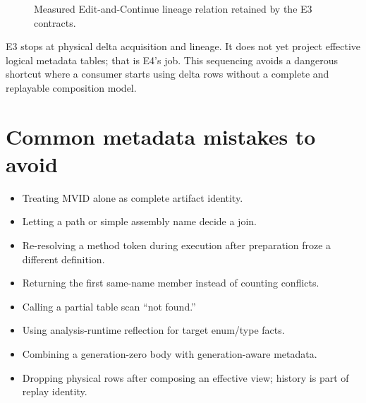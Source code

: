 \documentclass[11pt,oneside,openany]{book}
\begin{document}
\begin{figure}[htbp]
\centering
{}
\caption{Measured Edit-and-Continue lineage relation retained by the E3 contracts.}
\label{fig:enc-lineage}
\end{figure}

E3 stops at physical delta acquisition and lineage. It does not yet project effective logical metadata tables; that is E4's job. This sequencing avoids a dangerous shortcut where a consumer starts using delta rows without a complete and replayable composition model.

\section{Common metadata mistakes to avoid}

\begin{itemize}
  \item Treating MVID alone as complete artifact identity.
  \item Letting a path or simple assembly name decide a join.
  \item Re-resolving a method token during execution after preparation froze a different definition.
  \item Returning the first same-name member instead of counting conflicts.
  \item Calling a partial table scan ``not found.''
  \item Using analysis-runtime reflection for target enum/type facts.
  \item Combining a generation-zero body with generation-aware metadata.
  \item Dropping physical rows after composing an effective view; history is part of replay identity.
\end{itemize}
\end{document}

